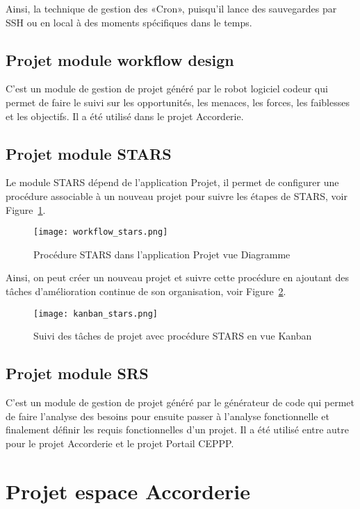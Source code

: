 Ainsi, la technique de gestion des «Cron», puisqu’il lance des sauvegardes par SSH ou en local à des moments spécifiques dans le temps.

\subsection{Projet module workflow design}

C’est un module de gestion de projet généré par le robot logiciel codeur qui permet de faire le suivi sur les opportunités, les menaces, les forces, les faiblesses et les objectifs. Il a été utilisé dans le projet Accorderie.

\subsection{Projet module STARS}

Le module STARS dépend de l’application Projet, il permet de configurer une procédure associable à un nouveau projet pour suivre les étapes de STARS, voir Figure~\ref{fig:workflow_stars}.

\begin{figure}
\centering
\texttt{[image: workflow\_stars.png]}
\caption{Procédure STARS dans l'application Projet vue Diagramme}
\label{fig:workflow_stars}
\end{figure}

Ainsi, on peut créer un nouveau projet et suivre cette procédure en ajoutant des tâches d'amélioration continue de son organisation, voir Figure~\ref{fig:kanban_stars}.

\begin{figure}
\centering
\texttt{[image: kanban\_stars.png]}
\caption{Suivi des tâches de projet avec procédure STARS en vue Kanban}
\label{fig:kanban_stars}
\end{figure}

\subsection{Projet module SRS}

C’est un module de gestion de projet généré par le générateur de code qui permet de faire l’analyse des besoins pour ensuite passer à l’analyse fonctionnelle et finalement définir les requis fonctionnelles d’un projet. Il a été utilisé entre autre pour le projet Accorderie et le projet Portail CEPPP.

\section{Projet espace Accorderie}

